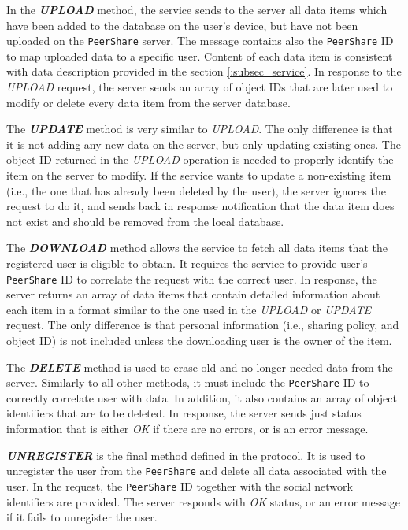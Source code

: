 \documentclass[twocolumn,a4paper,10pt]{article}
\newcommand{\peershare}{\texttt{PeerShare}\xspace}
\begin{document}
In the \textbf{\emph{UPLOAD}} method, the service sends to the server all data items which have been added to the database on the user's device, but have not been uploaded on the \peershare server. The message contains also the \peershare ID to map uploaded data to a specific user. Content of each data item is consistent with data description provided in the section \ref{:subsec_service}. In response to the \emph{UPLOAD} request, the server sends an array of object IDs that are later used to modify or delete every data item from the server database.

The \textbf{\emph{UPDATE}} method is very similar to \emph{UPLOAD}. The only difference is that it is not adding any new data on the server, but only updating existing ones. The object ID returned in the \emph{UPLOAD} operation is needed to properly identify the item on the server to modify. If the service wants to update a non-existing item (i.e., the one that has already been deleted by the user), the server ignores the request to do it, and sends back in response notification that the data item does not exist and should be removed from the local database.

The \textbf{\emph{DOWNLOAD}} method allows the service to fetch all data items that the registered user is eligible to obtain. It requires the service to provide user's \peershare ID to correlate the request with the correct user. In response, the server returns an array of data items that contain detailed information about each item in a format similar to the one used in the \emph{UPLOAD} or \emph{UPDATE} request. The only difference is that personal information (i.e., sharing policy, and object ID) is not included unless the downloading user is the owner of the item.

The \textbf{\emph{DELETE}} method is used to erase old and no longer needed data from the server. Similarly to all other methods, it must include the \peershare ID to correctly correlate user with data. In addition, it also contains an array of object identifiers that are to be deleted. In response, the server sends just status information that is either \emph{OK} if there are no errors, or is an error message.

\textbf{\emph{UNREGISTER}} is the final method defined in the protocol. It is used to unregister the user from the \peershare and delete all data associated with the user. In the request, the \peershare ID together with the social network identifiers are provided. The server responds with \emph{OK} status, or an error message if it fails to unregister the user.
\end{document}

